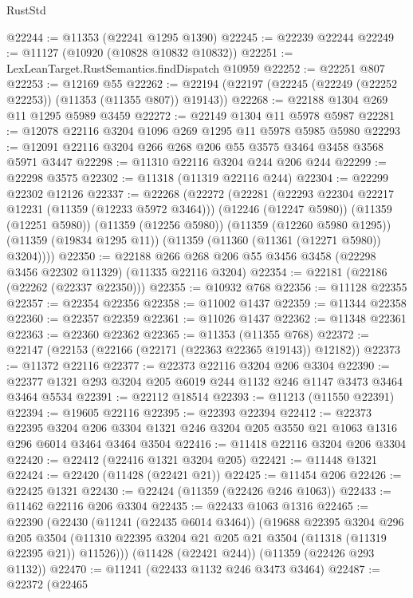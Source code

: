 \begin{lexlean}{RustStd}
\begin{coremodule}
{{{{{{{{{{{{{{{{{{{@22244 := @11353 (@22241 @1295 @1390)
@22245 := @22239 @22244
@22249 := @11127 (@10920 (@10828 @10832 @10832))
@22251 := LexLeanTarget.RustSemantics.findDispatch @10959
@22252 := @22251 @807
@22253 := @12169 @55
@22262 := @22194 (@22197 (@22245 (@22249 (@22252 @22253)) (@11353 (@11355 @807)) @19143))
@22268 := @22188 @1304 @269 @11 @1295 @5989 @3459
@22272 := @22149 @1304 @11 @5978 @5987
@22281 := @12078 @22116 @3204 @1096 @269 @1295 @11 @5978 @5985 @5980
@22293 := @12091 @22116 @3204 @266 @268 @206 @55 @3575 @3464 @3458 @3568 @5971 @3447
@22298 := @11310 @22116 @3204 @244 @206 @244
@22299 := @22298 @3575
@22302 := @11318 (@11319 @22116 @244)
@22304 := @22299 @22302 @12126
@22337 := @22268
    (@22272
      (@22281
        (@22293 @22304 @22217 @12231 (@11359 (@12233 @5972 @3464)))
        (@12246 (@12247 @5980))
        (@11359 (@12251 @5980))
        (@11359 (@12256 @5980))
        (@11359 (@12260 @5980 @1295))
        (@11359 (@19834 @1295 @11))
        (@11359 (@11360 (@11361 (@12271 @5980)) @3204))))
@22350 := @22188 @266 @268 @206 @55 @3456 @3458 (@22298 @3456 @22302 @11329) (@11335 @22116 @3204)
@22354 := @22181 (@22186 (@22262 (@22337 @22350)))
@22355 := @10932 @768
@22356 := @11128 @22355
@22357 := @22354 @22356
@22358 := @11002 @1437
@22359 := @11344 @22358
@22360 := @22357 @22359
@22361 := @11026 @1437
@22362 := @11348 @22361
@22363 := @22360 @22362
@22365 := @11353 (@11355 @768)
@22372 := @22147 (@22153 (@22166 (@22171 (@22363 @22365 @19143)) @12182))
@22373 := @11372 @22116
@22377 := @22373 @22116 @3204 @206 @3304
@22390 := @22377 @1321 @293 @3204 @205 @6019 @244 @1132 @246 @1147 @3473 @3464 @3464 @5534
@22391 := @22112 @18514
@22393 := @11213 (@11550 @22391)
@22394 := @19605 @22116
@22395 := @22393 @22394
@22412 := @22373
    @22395
    @3204
    @206
    @3304
    @1321
    @246
    @3204
    @205
    @3550
    @21
    @1063
    @1316
    @296
    @6014
    @3464
    @3464
    @3504
@22416 := @11418 @22116 @3204 @206 @3304
@22420 := @22412 (@22416 @1321 @3204 @205)
@22421 := @11448 @1321
@22424 := @22420 (@11428 (@22421 @21))
@22425 := @11454 @206
@22426 := @22425 @1321
@22430 := @22424 (@11359 (@22426 @246 @1063))
@22433 := @11462 @22116 @206 @3304
@22435 := @22433 @1063 @1316
@22465 := @22390
    (@22430
      (@11241 (@22435 @6014 @3464))
      (@19688
        @22395
        @3204
        @296
        @205
        @3504
        (@11310 @22395 @3204 @21 @205 @21 @3504 (@11318 (@11319 @22395 @21)) @11526)))
    (@11428 (@22421 @244))
    (@11359 (@22426 @293 @1132))
@22470 := @11241 (@22433 @1132 @246 @3473 @3464)
@22487 := @22372
    (@22465
}}}}}}}}}}}}}}}}}}}
\end{coremodule}
\end{lexlean}
